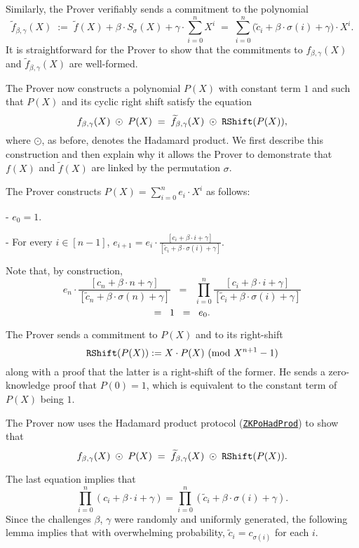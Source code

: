 \documentclass[11pt, lettersize, notitlepage, leqno, footskip=0.6cm]{article}
\newcommand{\wti}{\widetilde}
\newcommand{\be}{\beta}
\newcommand{\vs}{\vspace{-0.15cm}}
\newcommand{\noin}{\noindent}
\newcommand{\op}{overwhelming probability}
\newcommand{\Mod}[1]{\ (\mathrm{mod}\ #1)}
\numberwithin{equation}{section}
\begin{document}
Similarly, the Prover verifiably sends a commitment to the polynomial \vs $$ \wti{f}_{\be,\gamma}(X)\;:=\; \wti{f}(X)+\be\cdot S_{\sigma}(X)+\gamma\cdot \sum\limits_{i=0}^{n}  X^i\;=\;  \sum\limits_{i=0}^{n} \big(\wti{c}_i+\be\cdot \sigma(i) + \gamma\big)\cdot X^i. $$ It is straightforward for the Prover to show that the commitments to $f_{\be,\gamma}(X)$ and $\wti{f}_{\be,\gamma}(X)$ are well-formed.


The Prover now constructs a polynomial $P(X)$ with constant term $1$ and such that $P(X)$ and its cyclic right shift satisfy the equation \vs $$f_{\be,\gamma}(X)\;\odot\; P(X) \;=\; \wti{f}_{\be,\gamma}(X) \;\odot\; {\tt{RShift}}(P(X)),   $$ where $\odot$, as before, denotes the Hadamard product. We first describe this construction and then explain why it allows the Prover to demonstrate that $f(X)$ and $\wti{f}(X)$ are linked by the permutation $\sigma$.

The Prover constructs $P(X) = \sum_{i=0}^{n} e_i\cdot X^i  $ as follows: \vspace{2mm}

\noin - $e_0 = 1$. \vspace{1mm}

\noin - For every $i\in [n-1]$, $e_{i+1} = e_{i}\cdot \frac{[{c_i+\be\cdot i +\gamma}]}{ [{\wti{c}_i+\be\cdot \sigma(i) +\gamma}]}$. \vspace{2mm}

\noin Note that, by construction, \vs $$e_n\cdot \frac{[{c_n+\be\cdot n +\gamma}]}{ [{\wti{c}_n+\be\cdot \sigma(n) +\gamma}]}\;\; = \;\;\prod\limits_{i=0}^n  \frac{[{c_i+\be\cdot i +\gamma}]}{ [{\wti{c}_i+\be\cdot \sigma(i) +\gamma}]} $$ \vspace{-3mm} $$ = \;\;1 \;\;=\;\; e_0. \vs  $$

\noin The Prover sends a commitment to $P(X)$ and to its right-shift  $${\tt{RShift}}(P(X)):= X\cdot P(X)\Mod{X^{n+1}-1} $$ along with a proof that the latter is a right-shift of the former. He sends a zero-knowledge proof that $P(0) = 1$, which is equivalent to the constant term of $P(X)$ being $1$.

The Prover now uses the Hadamard product protocol (\hyperlink{HadProd}{\tt{ZKPoHadProd}}) to show that \vs $$f_{\be,\gamma}(X)\;\odot\; P(X) \;=\; \wti{f}_{\be,\gamma}(X) \;\odot\; {\tt{RShift}}(P(X)).   $$

\noin The last equation implies that 
\vs $$ \prod\limits_{i=0}^n (c_i+\be\cdot i + \gamma) = \prod\limits_{i=0}^n (\wti{c}_i+\be\cdot \sigma(i) + \gamma). $$ Since the challenges $\be$, $\gamma$ were randomly and uniformly generated, the following lemma implies that with \op, $\wti{c}_i = c_{\sigma(i)}$ for each $i$.
\end{document}
